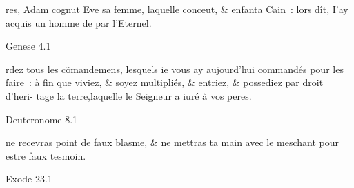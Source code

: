 \documentclass[paper=a6,pagesize=pdftex]{scrbook}
\newcommand{\bibleref}[1]{\begin{flushright}\tiny{#1}\end{flushright}}
\begin{document}
\pagestyle{empty}

\parbox{6cm}{
res, Adam cognut Eve sa fem\-me,
 laquelle conceut, \& enfan\-ta
 Cain~: lors dît, I'ay acquis un \linebreak
 homme de par l'Eternel.
 \bibleref{Genese 4.1}

\vfill

rdez tous les c\~omandemens, \linebreak
 lesquels ie vous ay aujourd'hui \linebreak
 commandés pour les faire~: à  \linebreak
 fin que viviez, \& soyez multipliés, \& \linebreak
 entriez, \& possediez par droit d'heri- \linebreak
 tage la terre,laquelle le Seigneur a iuré \linebreak à vos peres.
 \bibleref{Deuteronome 8.1}

\vfill

 ne recevras point de faux \linebreak
 blasme, \& ne mettras ta main \linebreak
 avec le meschant pour estre \linebreak
 faux tesmoin.
 \bibleref{Exode 23.1}
}
\end{document}
